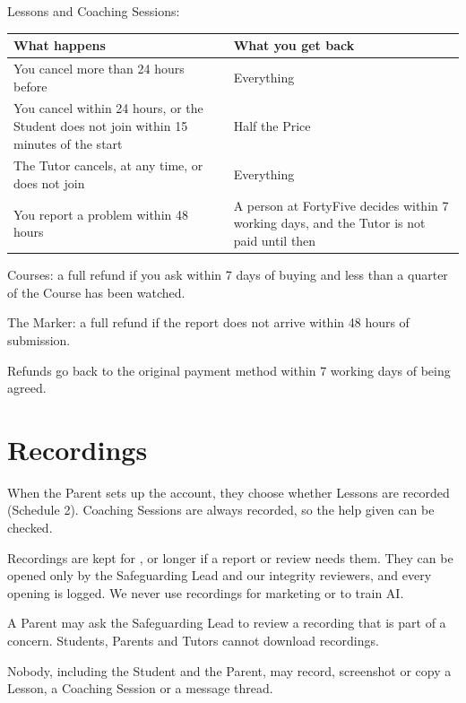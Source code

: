 \documentclass[11pt]{article}
\begin{document}
\begin{clauses}
  \item Lessons and Coaching Sessions:

  \renewcommand{\arraystretch}{1.2}
  \noindent\begin{tabularx}{\linewidth}{@{}>{\raggedright\arraybackslash}X >{\raggedright\arraybackslash}X@{}}
  \toprule
  What happens & What you get back \\
  \midrule
  You cancel more than 24 hours before & Everything \\
  You cancel within 24 hours, or the Student does not join within 15 minutes of the start & Half the Price \\
  The Tutor cancels, at any time, or does not join & Everything \\
  You report a problem within 48 hours & A person at FortyFive decides within 7 working days, and the Tutor is not paid until then \\
  \bottomrule
  \end{tabularx}

  \item Courses: a full refund if you ask within 7 days of buying and less than a quarter of the Course has been watched.
  \item The Marker: a full refund if the report does not arrive within 48 hours of submission.
  \item Refunds go back to the original payment method within 7 working days of being agreed.
\end{clauses}

\section{Recordings}

\begin{clauses}
  \item When the Parent sets up the account, they choose whether Lessons are recorded (Schedule 2). Coaching Sessions are always recorded, so the help given can be checked.
  \item Recordings are kept for , or longer if a report or review needs them. They can be opened only by the Safeguarding Lead and our integrity reviewers, and every opening is logged. We never use recordings for marketing or to train AI.
  \item A Parent may ask the Safeguarding Lead to review a recording that is part of a concern. Students, Parents and Tutors cannot download recordings.
  \item Nobody, including the Student and the Parent, may record, screenshot or copy a Lesson, a Coaching Session or a message thread.
\end{clauses}
\end{document}
